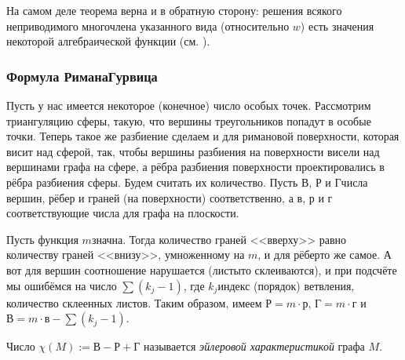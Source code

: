 \documentclass[a4paper]{article}
\begin{document}
На самом деле теорема верна и в обратную сторону: решения всякого неприводимого многочлена
указанного вида (относительно $w$) есть значения некоторой алгебраической функции (см. \cite[гл. IV, \S 11]{shabat}).

\subsubsection{Формула Римана\ч Гурвица}

Пусть у нас имеется некоторое (конечное) число особых точек. Рассмотрим
триангуляцию сферы, такую, что вершины треугольников
попадут в особые точки. Теперь такое же разбиение сделаем и для римановой поверхности, которая
висит над сферой, так, чтобы вершины разбиения на поверхности висели над вершинами графа на сфере,
а рёбра разбиения поверхности проектировались в рёбра разбиения сферы. Будем считать их количество.
Пусть $В$, $Р$ и $Г$\т числа вершин, рёбер и граней (на поверхности) соответственно, а $в$, $р$ и $г$\т
соответствующие числа для графа на плоскости.

Пусть функция $m$\д значна. Тогда количество граней <<вверху>> равно количеству граней <<внизу>>, умноженному на $m$,
и для рёбер\т то же самое. А вот для вершин соотношение нарушается (листы\д то склеиваются),
и при подсчёте мы ошибёмся на число $\sum (k_j - 1)$, где $k_j$\т индекс (порядок) ветвления, 
количество склеенных листов. Таким образом, имеем $Р=m\cdot р$, $Г = m \cdot г$ и $В = m\cdot в - \sum (k_j-1)$.

\begin{df}
Число $\chi(M) :=В-Р+Г$ называется \emph{эйлеровой характеристикой} графа $M$.
\end{df}
\end{document}
